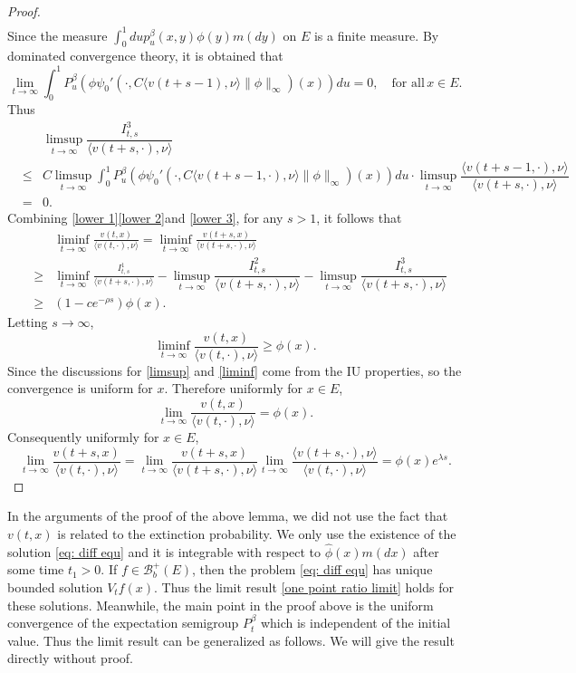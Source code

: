 \documentclass[12pt,a4paper]{amsart}
\theoremstyle{plain}
\theoremstyle{definition}
\numberwithin{equation}{section}
\begin{document}
\begin{proof}
{\begin{eqnarray*}
\end{eqnarray*}
Since the measure $\int_0^1 du p_u^{\beta}(x,y)\phi(y)m(dy)$ on $E$ is a finite measure.  By dominated convergence theory, it is obtained that
\begin{equation*}
\lim_{t\rightarrow\infty}\int_0^1P_u^{\beta}\left(\phi\psi_0'(\cdot, C\langle v(t+s-1),\nu\rangle\|\phi\|_{\infty})(x)\right)du=0, \quad \text{for all}\, x\in E.
\end{equation*}
Thus
\begin{eqnarray}\label{lower 3}
&&\limsup_{t\to\infty}\dfrac{I^3_{t,s}}{\langle v(t+s,\cdot),\nu\rangle}\\
&\leq&  C\limsup_{t\rightarrow\infty}\int_0^1P_u^{\beta}\left(\phi\psi_0'(\cdot, C\langle v(t+s-1,\cdot),\nu\rangle\|\phi\|_{\infty})(x)\right)du\cdot
\limsup_{t\rightarrow\infty}\dfrac{\langle v(t+s-1,\cdot),\nu\rangle}{\langle v(t+s,\cdot),\nu\rangle}\\
&=&0.
\end{eqnarray}
 Combining \eqref{lower 1}\eqref{lower 2}and \eqref{lower 3}, for any $s>1$, it follows that
\begin{eqnarray*}
	&&\liminf_{t\rightarrow\infty}\frac{v(t,x)}{\langle v(t,\cdot),\nu\rangle }
=\liminf_{t\rightarrow\infty}\frac{v(t+s,x)}{\langle v(t+s,\cdot),\nu\rangle }\\
&\geq& \liminf_{t\rightarrow\infty}\frac{I_{t,s}^1}{\langle v(t+s,\cdot),\nu\rangle }-\limsup_{t\to\infty}\dfrac{I^2_{t,s}}{\langle v(t+s,\cdot),\nu\rangle}-\limsup_{t\to\infty}\dfrac{I^3_{t,s}}{\langle v(t+s,\cdot),\nu\rangle}\\
	&\geq & (1-ce^{-\rho s})\phi(x).
\end{eqnarray*}
}
	Letting $s\to\infty$,
\begin{equation}\label{liminf}
	\liminf_{t\rightarrow\infty}\frac{v(t,x)}{\langle v(t,\cdot),\nu\rangle }\geq \phi(x).
\end{equation}
	Since the discussions for \eqref{limsup} and \eqref{liminf} come from the IU properties, so the convergence is uniform for $x$.  Therefore uniformly for $x\in E$,
\[
	\lim_{t\rightarrow\infty}\frac{v(t,x)}{\langle v(t,\cdot),\nu\rangle }=\phi(x).
\]
	Consequently uniformly for $x\in E$,
\[
	\lim_{t\rightarrow\infty}\frac{v(t+s,x)}{\langle v(t,\cdot),\nu\rangle }
	=\lim_{t\rightarrow\infty}\frac{v(t+s,x)}{\langle v(t+s,\cdot),\nu\rangle }\lim_{t\rightarrow\infty}\frac{\langle v(t+s,\cdot),\nu\rangle }{\langle v(t,\cdot),\nu\rangle }
	=\phi(x)e^{\lambda s}.
\]
\end{proof}
	In the arguments of the proof of the above lemma, we did not use the fact that $v(t,x)$ is related to the extinction probability.  We only use the existence of the solution \eqref{eq: diff equ} and it is integrable with respect to $\hat\phi(x)m(dx)$ after some time $t_1>0$.  If $f\in\mathcal B_b^+(E)$, then the problem \eqref{eq: diff equ} has unique bounded solution $V_tf(x)$.  Thus the limit result \eqref{one point ratio limit} holds for these solutions.  Meanwhile, the main point in the proof above is the uniform convergence of the expectation semigroup $P^{\beta}_t$ which is independent of the initial value.   Thus the limit result can be generalized as follows. We will give the result directly without proof.
\end{document}
